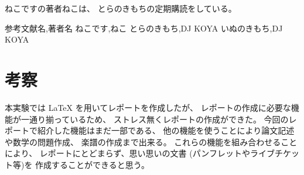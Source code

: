 \documentclass{jsarticle}
\begin{document}
ねこです\cite{neko}の著者ねこは、
とらのきもち\cite{tora}の定期購読をしている。

\begin{thebibliography}{9}
 参考文献名,著者名
 ねこです,ねこ
 とらのきもち,DJ KOYA
 いぬのきもち,DJ KOYA
\end{thebibliography}

\section{考察}
本実験では
\LaTeX
を用いてレポートを作成したが、
レポートの作成に必要な機能が一通り揃っているため、
ストレス無くレポートの作成ができた。
今回のレポートで紹介した機能はまだ一部である、
他の機能を使うことにより論文記述や数学の問題作成、
楽譜の作成まで出来る。
これらの機能を組み合わせることにより、
レポートにとどまらず、思い思いの文書
(パンフレットやライブチケット等)を
作成することができると思う。



\end{document}
